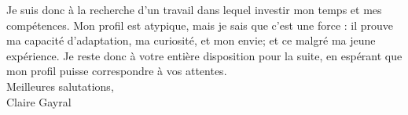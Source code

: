 \documentclass[a4paper,11pt]{article}
\begin{document}

Je suis donc à la recherche d'un travail dans lequel investir mon temps et mes compétences. Mon profil est atypique, mais je sais que c'est une force : il prouve ma capacité d'adaptation, ma curiosité, et mon envie; et ce malgré ma jeune expérience. 
% 
Je reste donc à votre entière disposition pour la suite, en espérant que mon profil puisse correspondre à vos attentes. \\

Meilleures salutations, \\

Claire Gayral
\end{document}

